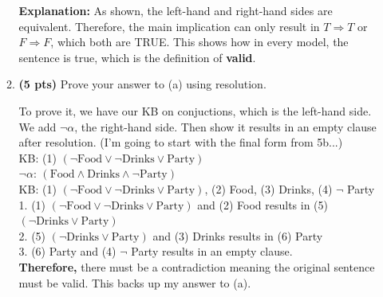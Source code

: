 \documentclass{article}
\begin{document}
\begin{enumerate}
\begin{enumerate}[label=($\alph*$)]
        \textbf{Explanation:} As shown, the left-hand and right-hand sides are equivalent. Therefore, the main implication can only result in $T \Rightarrow T$ or $F \Rightarrow F$, which both are TRUE. This shows how in every model, the sentence is true, which is the definition of \textbf{valid}.
    \color{black}



    \item \textbf{(5 pts)} Prove your answer to (a) using resolution.

    \color{blue}
        To prove it, we have our KB on conjuctions, which is the left-hand side. We add $\neg \alpha$, the right-hand side. Then show it results in an empty clause after resolution. (I'm going to start with the final form from 5b...)\\
        KB: (1) $(\neg \text{Food} \vee \neg \text{Drinks} \vee \text{Party})$\\
        $\neg \alpha$: $(\text{Food} \wedge \text{Drinks} \wedge \neg \text{Party})$ \\
        KB: (1) $(\neg \text{Food} \vee \neg \text{Drinks} \vee \text{Party})$, (2) Food, (3) Drinks, (4) $\neg$ Party\\
        1. (1) $(\neg \text{Food} \vee \neg \text{Drinks} \vee \text{Party})$ and (2) Food results in (5) $(\neg \text{Drinks} \vee \text{Party})$\\
        2. (5) $(\neg \text{Drinks} \vee \text{Party})$ and (3) Drinks results in (6) Party\\
        3. (6) Party and (4) $\neg$ Party results in an empty clause.\\
        \textbf{Therefore,} there must be a contradiction meaning the original sentence must be valid. This backs up my answer to (a).
    \color{black}

    
    \end{enumerate}


\end{enumerate}
\end{document}
